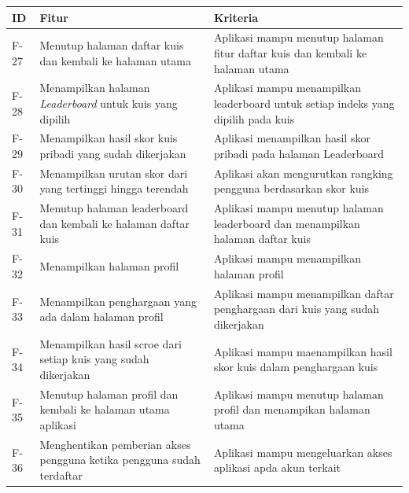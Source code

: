 \newpage
\begin{table}[H]
	\begin{tabular}{|m{1cm}|p{}|p{}|}
		\hline
		\centering\textbf{ID} & \centering\textbf{Fitur} & \multicolumn{1}{m{0.45\textwidth}|}{\centering \textbf{Kriteria}} \\
		\hline
		F-27&Menutup halaman daftar kuis dan kembali ke halaman utama& Aplikasi mampu menutup halaman fitur daftar kuis dan kembali ke halaman utama \\
		\hline
		F-28 &Menampilkan halaman \textit{Leaderboard} untuk kuis yang dipilih &Aplikasi mampu menampilkan leaderboard untuk setiap indeks yang dipilih pada kuis \\
		\hline
		F-29&Menampilkan hasil skor kuis pribadi yang sudah dikerjakan& Aplikasi menampilkan hasil skor pribadi pada halaman Leaderboard\\
		\hline
		F-30&Menampilkan urutan skor dari yang tertinggi hingga terendah& Aplikasi akan mengurutkan rangking pengguna berdasarkan skor kuis \\
		\hline
		F-31&Menutup halaman leaderboard dan kembali ke halaman daftar kuis& Aplikasi mampu menutup halaman leaderboard dan menampilkan halaman daftar kuis\\
		\hline
		F-32 &Menampilkan halaman profil& Aplikasi mampu menampilkan halaman profil \\
		\hline
		F-33&Menampilkan penghargaan yang ada dalam halaman profil& Aplikasi mampu menampilkan daftar penghargaan dari kuis yang sudah dikerjakan \\
		\hline
		F-34&Menampilkan hasil scroe dari setiap kuis yang sudah dikerjakan& Aplikasi mampu maenampilkan hasil skor kuis dalam penghargaan kuis\\
		\hline
		F-35&Menutup halaman profil dan kembali ke halaman utama aplikasi&Aplikasi mampu menutup halaman profil dan menampikan halaman utama \\
		\hline
		F-36 &Menghentikan pemberian akses pengguna ketika pengguna sudah terdaftar& Aplikasi mampu mengeluarkan akses aplikasi apda akun terkait\\
		\hline
	\end{tabular}
\end{table}
